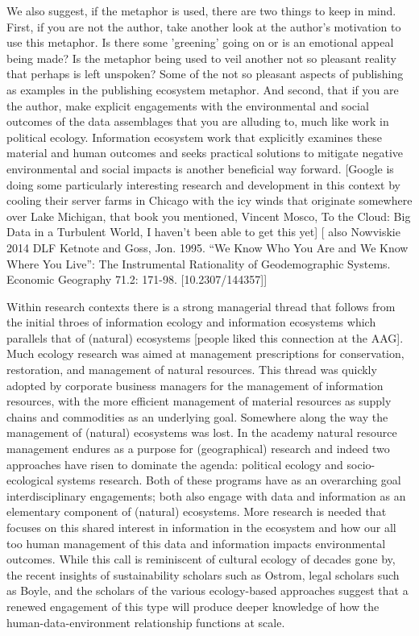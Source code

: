 We also suggest, if the metaphor is used, there are two things to keep in mind. First, if you are not the author, take another look at the author's motivation to use this metaphor. Is there some 'greening' going on or is an emotional appeal being made? Is the metaphor being used to veil another not so pleasant reality that perhaps is left unspoken? Some of the not so pleasant aspects of publishing as examples in the publishing ecosystem metaphor. And second, that if you are the author, make explicit engagements with the environmental and social outcomes of the data assemblages that you are alluding to, much like work in political ecology. Information ecosystem work that explicitly examines these material and human outcomes and seeks practical solutions to mitigate negative environmental and social impacts is another beneficial way forward. [Google is doing some particularly interesting research and development in this context by cooling their server farms in Chicago with the icy winds that originate somewhere over Lake Michigan, that book you mentioned, Vincent Mosco, To the Cloud: Big Data in a Turbulent World, I haven't been able to get this yet] [ also Nowviskie 2014 DLF Ketnote and Goss, Jon. 1995. “We Know Who You Are and We Know Where You Live”: The Instrumental Rationality of Geodemographic Systems. Economic Geography 71.2: 171-98. [10.2307/144357]]

Within research contexts there is a strong managerial thread that follows from the initial throes of information ecology and information ecosystems which parallels that of (natural) ecosystems [people liked this connection at the AAG]. Much ecology research was aimed at management prescriptions for conservation, restoration, and management of natural resources. This thread was quickly adopted by corporate business managers for the management of information resources, with the more efficient management of material resources as supply chains and commodities as an underlying goal. Somewhere along the way the management of (natural) ecosystems was lost. In the academy natural resource management endures as a purpose for (geographical) research and indeed two approaches have risen to dominate the agenda: political ecology and socio-ecological systems research. Both of these programs have as an overarching goal interdisciplinary engagements; both also engage with data and information as an elementary component of (natural) ecosystems. More research is needed that focuses on this shared interest in information in the ecosystem and how our all too human management of this data and information impacts environmental outcomes. While this call is reminiscent of cultural ecology of decades gone by, the recent insights of sustainability scholars such as Ostrom, legal scholars such as Boyle, and the scholars of the various ecology-based approaches suggest that a renewed engagement of this type will produce deeper knowledge of how the human-data-environment relationship functions at scale.

